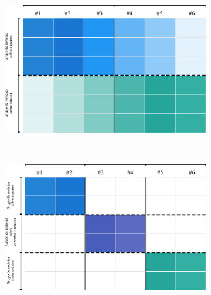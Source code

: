 \documentclass[
    12pt,                %
    oneside,            %
    a4paper,            %
    english,            %
    brazil                %
    ]{abntex2ppgsi}
\begin{document}
\begin{figure} [htpb]
\centering
 \caption{
        Representação de uma aplicação de mineração de dados implementada a partir de análise de agrupamento com similaridade total (a) e similaridade parcial (b,c). Os grupos são diferenciados por cores.
    }
    \begin{subfigure}[b]{0.45\textwidth}
        \includegraphics[width=\textwidth]{img/sistema0.png}
        \caption{}
        \label{fig:sistema:a}
    \end{subfigure}
    ~
    \begin{subfigure}[b]{0.45\textwidth}
        \includegraphics[width=\textwidth]{img/sistema1.png}
        \caption{}
        \label{fig:sistema:b}
    \end{subfigure}
    ~
    \begin{subfigure}[b]{0.45\textwidth}

\end{subfigure}
\end{figure}
\end{document}
